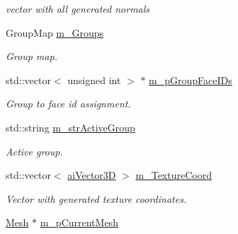 \begin{DoxyCompactItemize}
\begin{DoxyCompactList}\small\item\em vector with all generated normals \end{DoxyCompactList}\item 
\hypertarget{struct_assimp_1_1_obj_file_1_1_model_a2b7ff611229047ca31e96c69f1de78ea}{Group\+Map \hyperlink{struct_assimp_1_1_obj_file_1_1_model_a2b7ff611229047ca31e96c69f1de78ea}{m\+\_\+\+Groups}}\label{struct_assimp_1_1_obj_file_1_1_model_a2b7ff611229047ca31e96c69f1de78ea}

\begin{DoxyCompactList}\small\item\em Group map. \end{DoxyCompactList}\item 
\hypertarget{struct_assimp_1_1_obj_file_1_1_model_af7f7df39f253aa2b43ee9d33f59f8021}{std\+::vector$<$ unsigned int $>$ $\ast$ \hyperlink{struct_assimp_1_1_obj_file_1_1_model_af7f7df39f253aa2b43ee9d33f59f8021}{m\+\_\+p\+Group\+Face\+I\+Ds}}\label{struct_assimp_1_1_obj_file_1_1_model_af7f7df39f253aa2b43ee9d33f59f8021}

\begin{DoxyCompactList}\small\item\em Group to face id assignment. \end{DoxyCompactList}\item 
\hypertarget{struct_assimp_1_1_obj_file_1_1_model_a63d3557d243ab2934d70a0079368ab79}{std\+::string \hyperlink{struct_assimp_1_1_obj_file_1_1_model_a63d3557d243ab2934d70a0079368ab79}{m\+\_\+str\+Active\+Group}}\label{struct_assimp_1_1_obj_file_1_1_model_a63d3557d243ab2934d70a0079368ab79}

\begin{DoxyCompactList}\small\item\em Active group. \end{DoxyCompactList}\item 
\hypertarget{struct_assimp_1_1_obj_file_1_1_model_a8c1f710401c1eaa1154f982e6cc26635}{std\+::vector$<$ \hyperlink{structai_vector3_d}{ai\+Vector3\+D} $>$ \hyperlink{struct_assimp_1_1_obj_file_1_1_model_a8c1f710401c1eaa1154f982e6cc26635}{m\+\_\+\+Texture\+Coord}}\label{struct_assimp_1_1_obj_file_1_1_model_a8c1f710401c1eaa1154f982e6cc26635}

\begin{DoxyCompactList}\small\item\em Vector with generated texture coordinates. \end{DoxyCompactList}\item 
\hypertarget{struct_assimp_1_1_obj_file_1_1_model_a9e06419d5e367be2cb21db8e27c83eb9}{\hyperlink{struct_assimp_1_1_obj_file_1_1_mesh}{Mesh} $\ast$ \hyperlink{struct_assimp_1_1_obj_file_1_1_model_a9e06419d5e367be2cb21db8e27c83eb9}{m\+\_\+p\+Current\+Mesh}}\label{struct_assimp_1_1_obj_file_1_1_model_a9e06419d5e367be2cb21db8e27c83eb9}


\end{DoxyCompactItemize}
